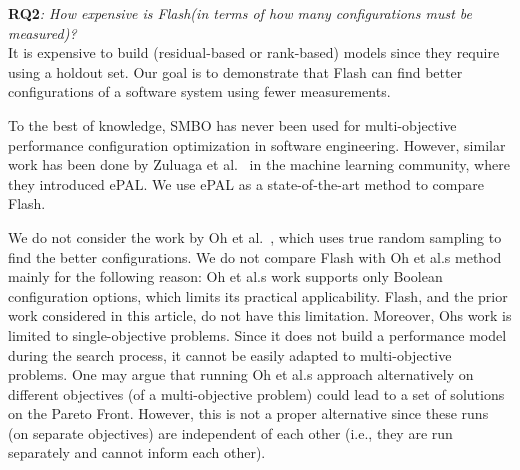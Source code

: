 \documentclass[10pt,journal,compsoc]{IEEEtran}
\newcommand{\flash}{{\sc Flash}\xspace}
\begin{document}
\noindent\textbf{RQ2}\textit{: How expensive is \flash (in terms of
 how many configurations must be measured)?}\\
It is expensive to build (residual-based or rank-based) models since they require using a holdout set. Our goal is to  demonstrate that \flash can find better configurations of a software system using fewer measurements.

To the best of knowledge, SMBO has never been used for multi-objective performance configuration optimization in software engineering. However, similar work has been done by Zuluaga et al.~\cite{zuluaga2016varepsilon} in the machine learning community, where they introduced ePAL. We use ePAL as a state-of-the-art method to compare \flash.

We do not consider the work by Oh et al.~\cite{oh2017finding}, which uses true random sampling to find the better configurations. We do not compare \flash with Oh et al.\textquotesingle s method mainly for the following reason: Oh et al.\textquotesingle s work supports only Boolean configuration options, which limits its practical applicability. \flash, and the prior work considered in this article, do not have this limitation. Moreover, Oh\textquotesingle s work is limited to single-objective problems. 
Since it does not build a performance model during the search process, it cannot be easily adapted  to multi-objective problems. 
One may argue that running Oh et al.\textquotesingle s approach alternatively on different objectives (of a multi-objective problem) could lead to a set of solutions on the Pareto Front. However, this is not a proper alternative since these runs (on separate objectives) are independent of each other (i.e., they are run separately and cannot inform each other).%

\end{document}
